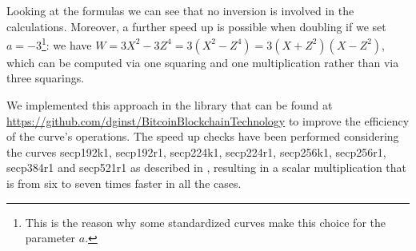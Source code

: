 Looking at the formulas we can see that no inversion is involved in the calculations. Moreover, a further speed up is possible when doubling if we set $a = -3$\footnote{This is the reason why some standardized curves make this choice for the parameter $a$.}: we have $W = 3X^2 -3Z^4 = 3(X^2 - Z^4) = 3(X + Z^2)(X - Z^2)$, which can be computed via one squaring and one multiplication rather than via three squarings.

\bigskip
\noindent
We implemented this approach in the library that can be found at \url{https://github.com/dginst/BitcoinBlockchainTechnology} to improve the efficiency of the curve's operations. The speed up checks have been performed considering the curves secp192k1, secp192r1, secp224k1, secp224r1, secp256k1, secp256r1, secp384r1 and secp521r1 as described in \cite{RefWork:3}, resulting in a scalar multiplication that is from six to seven times faster in all the cases.

\bigskip

